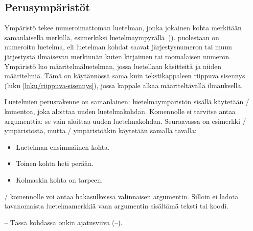 \subsection{Perusympäristöt}
\label{luku/luetelma-perus}

Ympäristö  tekee numeroimattoman luetelman, jonka
jokainen kohta merkitään samanlaisella merkillä, esimerkiksi
luetelmaympyrällä~(\textbullet).  puolestaan on
numeroitu luetelma, eli luetelman kohdat saavat järjestysnumeron tai
muun järjestystä ilmaisevan merkinnän kuten kirjaimen tai roomalaisen
numeron. Ympäristö  luo määritelmäluetelman,
jossa luetellaan käsitteitä ja niiden määritelmiä. Tämä on käytännössä
sama kuin tekstikappaleen riippuva sisennys (luku
\ref{luku/riippuva-sisennys}), jossa kappale alkaa määriteltävällä
ilmauksella.

Luetelmien perusrakenne on samanlainen: luetelmaympäristön sisällä
käytetään \-/ komentoa, joka aloittaa uuden
luetelmakohdan. Komennolle ei tarvitse antaa argumenttia: se vain
aloittaa uuden luetelmakohdan. Seuraavassa on esimerkki
\-/ ympäristöstä, mutta \-/
ympäristöäkin käytetään samalla tavalla:

\begin{koodilohkosis}
\begin{itemize}
\item Luetelman ensimmäinen kohta.
\item Toinen kohta heti perään.
\item Kolmaskin kohta on tarpeen.
\end{itemize}
\end{koodilohkosis}

\noindent
{}\-/ komennolle voi antaa hakasulkeissa valinnaisen
argumentin. Silloin ei ladota tavanomaista luetelmamerkkiä vaan
argumentin sisältämä teksti tai koodi.

\begin{koodilohkosis}
\item[--] Tässä kohdassa onkin ajatusviiva (--).
\end{koodilohkosis}

